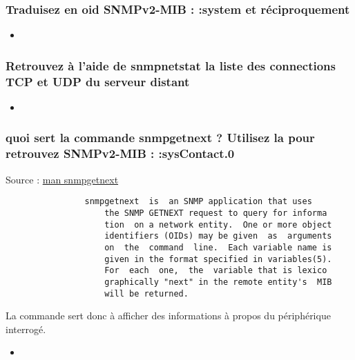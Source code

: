 \documentclass[10pt,a4paper]{article}
\newcommand{\insertcode}[2]{\begin{itemize}\item[]\end{itemize}}
\begin{document}
\subsubsection{Traduisez en oid SNMPv2-MIB : :system et réciproquement}
\insertcode{commande/7.txt}{Traduction}

\subsubsection{Retrouvez à l’aide de snmpnetstat la liste des connections TCP et UDP du serveur distant}
\insertcode{commande/8.txt}{snmpNetstat}


\subsubsection{ quoi sert la commande snmpgetnext ? Utilisez la pour retrouvez SNMPv2-MIB : :sysContact.0}
Source : \url{man snmpgetnext}
\begin{lstlisting}
                snmpgetnext  is  an SNMP application that uses
                    the SNMP GETNEXT request to query for informa
                    tion  on a network entity.  One or more object
                    identifiers (OIDs) may be given  as  arguments
                    on  the  command  line.  Each variable name is
                    given in the format specified in variables(5).
                    For  each  one,  the  variable that is lexico
                    graphically "next" in the remote entity's  MIB
                    will be returned.

\end{lstlisting}
La commande sert donc à afficher des informations à propos du périphérique interrogé.
\insertcode{commande/9.txt}{snmpgetnext}
\end{document}
